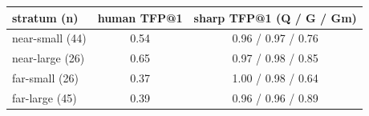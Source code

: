 \begin{tabular}{lcc}
\toprule
stratum (n) & human TFP@1 & sharp TFP@1 (Q / G / Gm) \\
\midrule
near-small (44) & 0.54 & 0.96 / 0.97 / 0.76 \\
near-large (26) & 0.65 & 0.97 / 0.98 / 0.85 \\
far-small (26) & 0.37 & 1.00 / 0.98 / 0.64 \\
far-large (45) & 0.39 & 0.96 / 0.96 / 0.89 \\
\bottomrule
\end{tabular}
